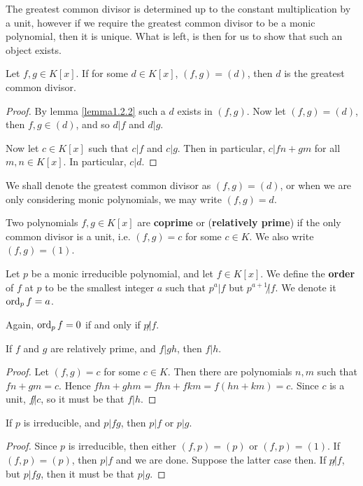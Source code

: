 The greatest common divisor is determined up to the constant multiplication by a unit, however if we require the greatest common divisor to be a monic polynomial, then it is unique. What is left, is then for us to show that such an object exists.

\begin{lemma}\label{lemma1.2.3}
    Let $f,g \in K[x]$. If for some $d \in K[x]$, $(f,g)=(d)$, then $d$ is the greatest common divisor.
\end{lemma}
\begin{proof}
    By lemma \ref{lemma1.2.2} such a $d$ exists in $(f,g)$. Now let $(f,g)=(d)$, then $f,g \in (d)$, and so $d|f$ and $d|g$.
    
    Now let $c \in K[x]$ such that $c|f$ and $c|g$. Then in particular, $c|fn+gm$ for all $m,n \in K[x]$. In particular, $c|d$.
\end{proof}

We shall denote the greatest common divisor as $(f,g)=(d)$, or when we are only considering monic polynomials, we may write $(f,g)=d$.

\begin{definition}
    Two polynomials $f,g \in K[x]$ are \textbf{coprime} or (\textbf{relatively prime}) if the only common divisor is a unit, i.e. $(f,g)=c$ for some $c \in K$. We also write $(f,g)=(1)$. 
\end{definition}

\begin{definition}
    Let $p$ be a monic irreducible polynomial, and let $f \in K[x]$. We define the \textbf{order} of $f$ at $p$ to be the smallest integer $a$ such that $p^a|f$ but $p^{a+1} \not| f$. We denote it $\operatorname{ord}_p{f}=a$. 
\end{definition}

Again, $\operatorname{ord}_p{f}=0$ if and only if $p \not| f$.

\begin{proposition}\label{proposition1.2.4}
    If $f$ and $g$ are relatively prime, and $f|gh$, then $f|h$.
\end{proposition}
\begin{proof}
    Let $(f,g)=c$ for some $c \in K$. Then there are polynomials $n,m$ such that $fn+gm=c$. Hence $fhn+ghm=fhn+fkm=f(hn+km)=c$. Since $c$ is a unit, $f \not| c$, so it must be that $f|h$. 
\end{proof}

\begin{corollary}
    If $p$ is irreducible, and $p|fg$, then $p|f$ or $p|g$.
\end{corollary}
\begin{proof}
    Since $p$ is irreducible, then either $(f,p)=(p)$ or $(f,p)=(1)$. If $(f,p)=(p)$, then $p|f$ and we are done. Suppose the latter case then. If $p \not|f$, but $p|fg$, then it must be that $p|g$. 
\end{proof}

